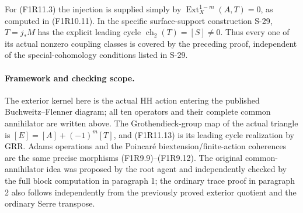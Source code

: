 For (F1R11.3) the injection is supplied simply by
$\operatorname{Ext}^{1-m}_X(A,T)=0$, as computed in
(F1R10.11). In the specific surface-support construction
S-29, $T=j_*M$ has the explicit leading cycle
$\operatorname{ch}_2(T)=[S]\ne0$. Thus every one of its
actual nonzero coupling classes is covered by the
preceding proof, independent of the special-cohomology
conditions listed in S-29.

\paragraph{Framework and checking scope.}
The exterior kernel here is the actual HH action entering
the published Buchweitz--Flenner diagram; all ten operators
and their complete common annihilator are written above.
The Grothendieck-group map of the actual triangle is
$[E]=[A]+(-1)^m[T]$, and (F1R11.13) is its leading
cycle realization by GRR. Adams operations and the
Poincar\'e biextension/finite-action coherences are the
same precise morphisms (F1R9.9)--(F1R9.12). The original
common-annihilator idea was proposed by the root agent
and independently checked by the full block computation
in paragraph 1; the ordinary trace proof in paragraph 2
also follows independently from the previously proved
exterior quotient and the ordinary Serre transpose.
